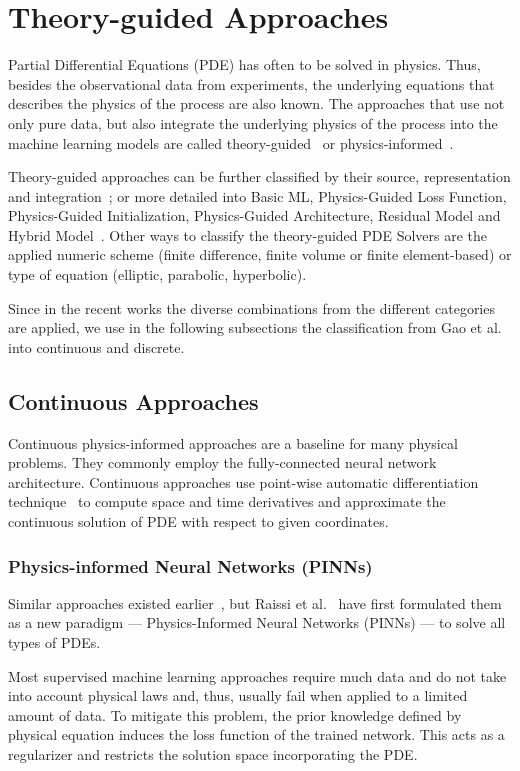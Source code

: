 \section{Theory-guided Approaches}
\label{sec:tga}
Partial Differential Equations (PDE) has often to be solved in physics. Thus, besides the observational data from experiments, the underlying equations that describes the physics of the process are also known. The approaches that use not only pure data, but also integrate the underlying physics of the process into the machine learning models are called theory-guided~\cite{tgds} or physics-informed~\cite{Raissi19}. 

Theory-guided approaches can be further classified by their source, representation and integration~\cite{inltax}; or more detailed into Basic ML, Physics-Guided
Loss Function, Physics-Guided Initialization, Physics-Guided Architecture, Residual Model and Hybrid Model~\cite{survey}. Other ways to classify the theory-guided PDE Solvers are the applied numeric scheme (finite difference, finite volume or finite element-based) or type of equation (elliptic, parabolic, hyperbolic).

Since in the recent works the diverse combinations from the different categories are applied, we use in the following subsections the classification from Gao et al.~\cite{Gao21} into continuous and discrete.


\subsection{Continuous Approaches}
Continuous physics-informed approaches are a baseline for many physical problems. They commonly employ the fully-connected neural network architecture. Continuous approaches use point-wise automatic differentiation technique~\cite{ad} to compute space and time derivatives and approximate the continuous solution of PDE with respect to given coordinates. 

\subsubsection{Physics-informed Neural Networks (PINNs)}
Similar approaches existed earlier~\cite{similarPINN}, but Raissi et al.~\cite{Raissi19, Raissi1, Raissi2} have first formulated them as a new paradigm --- Physics-Informed Neural Networks (PINNs) --- to solve all types of PDEs. 

Most supervised machine learning approaches require much data and do not take into account physical laws and, thus, usually fail when applied to a limited amount of data. To mitigate this problem, the prior knowledge defined by physical equation induces the loss function of the trained network. This acts as a regularizer and restricts the solution space incorporating the PDE.

